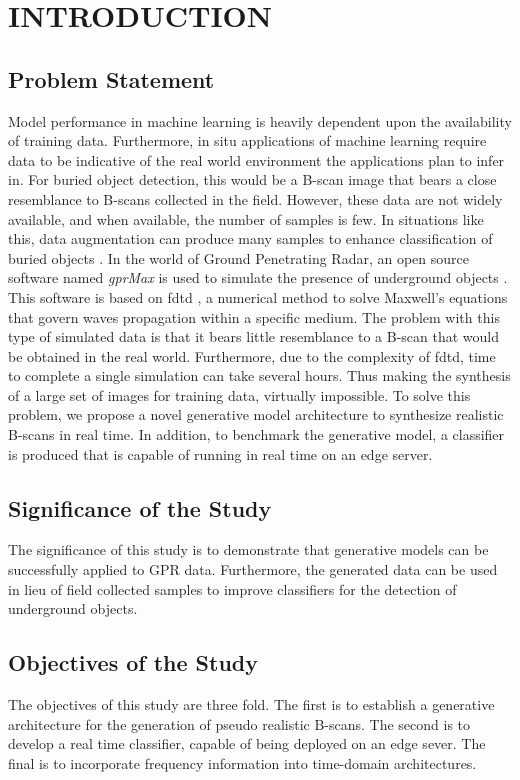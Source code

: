 \chapter{INTRODUCTION}
\doublespacing
\section{Problem Statement}
\hspace{0.5in}Model performance in machine learning is heavily dependent upon the availability of training data. Furthermore, in situ applications of machine learning require data to be indicative of the real world environment the applications plan to infer in. For buried object detection, this would be a B-scan image that bears a close resemblance to B-scans collected in the field. However, these data are not widely available, and when available, the number of samples is few. In situations like this, data augmentation can produce many samples to enhance classification of buried objects  \cite{DBLP}. In the world of Ground Penetrating Radar, an open source software named \textit{gprMax} is used to simulate the presence of underground objects \cite{gprMax}. This software is based on \acrfull{fdtd} \cite{FDTD}, a numerical method to solve Maxwell's equations that govern waves propagation within a specific medium. The problem with this type of simulated data is that it bears little resemblance to a B-scan that would be obtained in the real world. Furthermore, due to the complexity of \acrshort{fdtd}, time to complete a single simulation can take several hours. Thus making the synthesis of a large set of images for training data, virtually impossible. To solve this problem, we propose a novel generative model architecture to synthesize realistic B-scans in real time. In addition, to benchmark the generative model, a classifier is produced that is capable of running in real time on an edge server.

\section{Significance of the Study}
\hspace{0.5in}The significance of this study is to demonstrate that generative models can be successfully applied to GPR data. Furthermore, the generated data can be used in lieu of field collected samples to improve classifiers for the detection of underground objects.

\section{Objectives of the Study}
\hspace{0.5in}The objectives of this study are three fold. The first is to establish a generative architecture for the generation of pseudo realistic B-scans. The second is to develop a real time classifier, capable of being deployed on an edge sever. The final is to incorporate frequency information into time-domain architectures.


